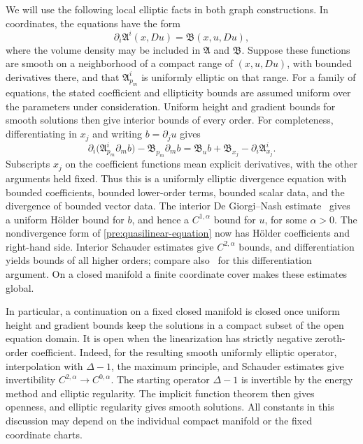We will use the following local elliptic facts in both graph constructions.
In coordinates, the equations have the form
\begin{equation}\label{pre:quasilinear-equation}
 \partial_i\mathfrak A^i(x,Du)=\mathfrak B(x,u,Du),
\end{equation}
where the volume density may be included in $\mathfrak A$ and
$\mathfrak B$. Suppose these functions are smooth on a neighborhood
of a compact range of $(x,u,Du)$, with bounded derivatives there, and
that $\mathfrak A^i_{p_m}$ is uniformly elliptic on that range.
For a family of equations, the stated coefficient and ellipticity
bounds are assumed uniform over the parameters under consideration.
Uniform height and gradient bounds for smooth solutions then give
interior bounds of every order. For completeness, differentiating in
$x_j$ and writing $b=\partial_j u$ gives
\begin{equation}\label{pre:differentiated-equation}
 \partial_i\bigl(\mathfrak A^i_{p_m}\partial_m b\bigr)
       -\mathfrak B_{p_m}\partial_m b
   =\mathfrak B_u b+\mathfrak B_{x_j}
                       -\partial_i\mathfrak A^i_{x_j}.
\end{equation}
Subscripts $x_j$ on the coefficient functions mean explicit derivatives,
with the other arguments held fixed. Thus this is a uniformly elliptic
divergence equation with bounded coefficients, bounded lower-order
terms, bounded scalar data, and the divergence of bounded vector data.
The interior De Giorgi--Nash estimate~\cite[Theorem~8.24]{GilbargTrudinger2001}
gives a uniform H\"older bound
for $b$, and hence a $C^{1,\alpha}$ bound for $u$, for some $\alpha>0$.
The nondivergence form of \eqref{pre:quasilinear-equation} now has
H\"older coefficients and right-hand side. Interior Schauder estimates
\cite[Theorem~6.2 and Corollary~6.3]{GilbargTrudinger2001}
give $C^{2,\alpha}$ bounds, and differentiation yields bounds of all
higher orders; compare also~\cite[Theorem~13.1]{GilbargTrudinger2001}
for this differentiation argument. On a closed manifold a finite coordinate cover makes
these estimates global.

In particular, a continuation on a fixed closed manifold is closed
once uniform height and gradient bounds keep the solutions in a compact
subset of the open equation domain. It is open when the linearization
has strictly negative zeroth-order coefficient. Indeed, for the resulting
smooth uniformly elliptic operator, interpolation with $\Delta-1$,
the maximum principle, and Schauder estimates give invertibility
$C^{2,\alpha}\to C^{0,\alpha}$. The starting operator $\Delta-1$ is
invertible by the energy method and elliptic regularity. The implicit
function theorem then gives openness, and elliptic regularity gives
smooth solutions. All constants in this discussion may depend on the
individual compact manifold or the fixed coordinate charts.


